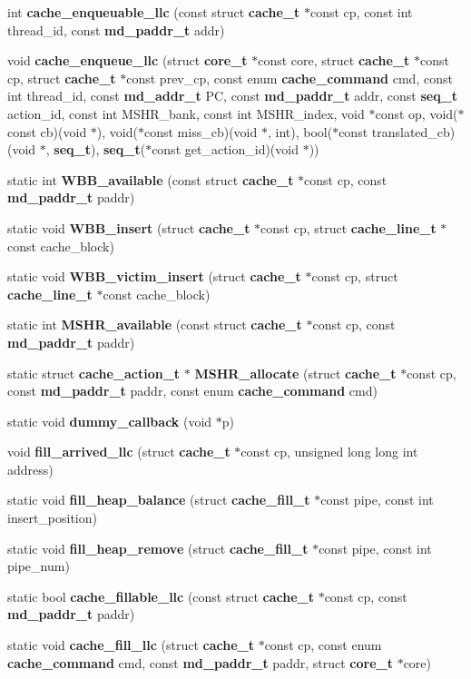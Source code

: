 \begin{CompactItemize}
\item 
int {\bf cache\_\-enqueuable\_\-llc} (const struct {\bf cache\_\-t} $\ast$const cp, const int thread\_\-id, const {\bf md\_\-paddr\_\-t} addr)
\item 
void {\bf cache\_\-enqueue\_\-llc} (struct {\bf core\_\-t} $\ast$const core, struct {\bf cache\_\-t} $\ast$const cp, struct {\bf cache\_\-t} $\ast$const prev\_\-cp, const enum {\bf cache\_\-command} cmd, const int thread\_\-id, const {\bf md\_\-addr\_\-t} PC, const {\bf md\_\-paddr\_\-t} addr, const {\bf seq\_\-t} action\_\-id, const int MSHR\_\-bank, const int MSHR\_\-index, void $\ast$const op, void($\ast$const cb)(void $\ast$), void($\ast$const miss\_\-cb)(void $\ast$, int), bool($\ast$const translated\_\-cb)(void $\ast$, {\bf seq\_\-t}), {\bf seq\_\-t}($\ast$const get\_\-action\_\-id)(void $\ast$))
\item 
static int {\bf WBB\_\-available} (const struct {\bf cache\_\-t} $\ast$const cp, const {\bf md\_\-paddr\_\-t} paddr)
\item 
static void {\bf WBB\_\-insert} (struct {\bf cache\_\-t} $\ast$const cp, struct {\bf cache\_\-line\_\-t} $\ast$const cache\_\-block)
\item 
static void {\bf WBB\_\-victim\_\-insert} (struct {\bf cache\_\-t} $\ast$const cp, struct {\bf cache\_\-line\_\-t} $\ast$const cache\_\-block)
\item 
static int {\bf MSHR\_\-available} (const struct {\bf cache\_\-t} $\ast$const cp, const {\bf md\_\-paddr\_\-t} paddr)
\item 
static struct {\bf cache\_\-action\_\-t} $\ast$ {\bf MSHR\_\-allocate} (struct {\bf cache\_\-t} $\ast$const cp, const {\bf md\_\-paddr\_\-t} paddr, const enum {\bf cache\_\-command} cmd)
\item 
static void {\bf dummy\_\-callback} (void $\ast$p)
\item 
void {\bf fill\_\-arrived\_\-llc} (struct {\bf cache\_\-t} $\ast$const cp, unsigned long long int address)
\item 
static void {\bf fill\_\-heap\_\-balance} (struct {\bf cache\_\-fill\_\-t} $\ast$const pipe, const int insert\_\-position)
\item 
static void {\bf fill\_\-heap\_\-remove} (struct {\bf cache\_\-fill\_\-t} $\ast$const pipe, const int pipe\_\-num)
\item 
static bool {\bf cache\_\-fillable\_\-llc} (const struct {\bf cache\_\-t} $\ast$const cp, const {\bf md\_\-paddr\_\-t} paddr)
\item 
static void {\bf cache\_\-fill\_\-llc} (struct {\bf cache\_\-t} $\ast$const cp, const enum {\bf cache\_\-command} cmd, const {\bf md\_\-paddr\_\-t} paddr, struct {\bf core\_\-t} $\ast$core)

\end{CompactItemize}
